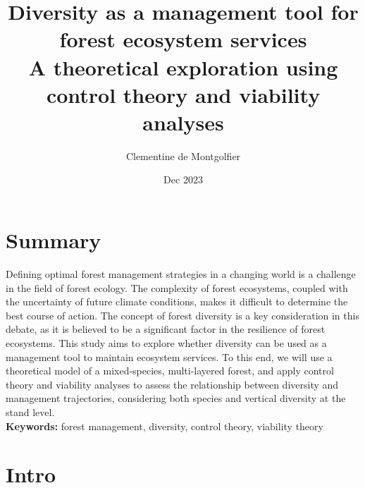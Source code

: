 \documentclass{article}
\title{Diversity as a management tool for forest ecosystem services \\ 
\large A theoretical exploration using control theory and viability analyses}
\author{Clementine de Montgolfier}
\date{Dec 2023}
\begin{document}
\maketitle

\section{Summary}

Defining optimal forest management strategies in a changing world is a challenge in the field of forest ecology. The complexity of forest ecosystems, coupled with the uncertainty of future climate conditions, makes it difficult to determine the best course of action. The concept of forest diversity is a key consideration in this debate, as it is believed to be a significant factor in the resilience of forest ecosystems. This study aims to explore whether diversity can be used as a management tool to maintain ecosystem services. To this end, we will use a theoretical model of a mixed-species, multi-layered forest, and apply control theory and viability analyses to assess the relationship between diversity and management trajectories, considering both species and vertical diversity at the stand level.\\

\noindent \textbf{Keywords:} forest management, diversity, control theory, viability theory

\section{Intro}
\end{document}
